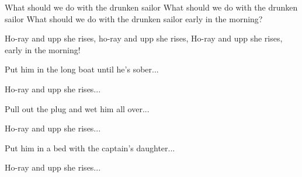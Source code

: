 
  
\beginverse*                                        
What should we do with the drunken sailor 
What should we do with the drunken sailor
What should we do with the drunken sailor 
early in the morning?
\endverse

\beginchorus
Ho-ray and upp she rises,
ho-ray and upp she rises,
Ho-ray and upp she rises,
early in the morning!
\endchorus

\beginverse*
Put him in the long boat until he's sober...
\endverse

\beginchorus
Ho-ray and upp she rises...
\endchorus

\beginverse*
Pull out the plug and wet him all over...
\endverse

\beginchorus
Ho-ray and upp she rises...
\endchorus

\beginverse*
Put him in a bed with the captain's daughter...
\endverse

\beginchorus
Ho-ray and upp she rises...
\endchorus
\endsong
